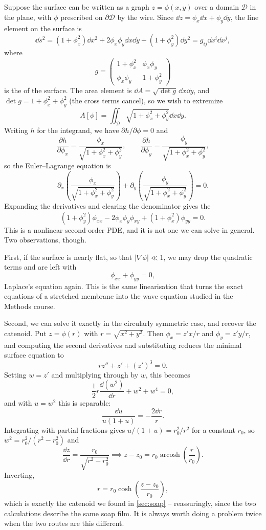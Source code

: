 Suppose the surface can be written as a graph $z = \phi(x, y)$ over a domain $\mathcal{D}$ in the plane, with $\phi$ prescribed on $\partial \mathcal D$ by the wire. Since $\dd z = \phi_x \dd x + \phi_y \dd y$, the line element on the surface is
$$
\dd s^2 = \left(1 + \phi_x^2\right)\dd x^2 + 2\phi_x\phi_y \dd x \dd y + \left(1 + \phi_y^2\right)\dd y^2 = g_{ij}\dd x^i \dd x^j,
$$
where
$$
g = \begin{pmatrix} 1 + \phi_x^2 & \phi_x\phi_y \\ \phi_x\phi_y & 1 + \phi_y^2\end{pmatrix}
$$
is the  of the surface. The area element is $\dd A = \sqrt{\det g}\,\dd x\dd y$, and $\det g = 1 + \phi_x^2 + \phi_y^2$ (the cross terms cancel), so we wish to extremize
$$
A[\phi] = \iint_{\mathcal D}\sqrt{1 + \phi_x^2 + \phi_y^2}\dd x \dd y.
$$
Writing $h$ for the integrand, we have $\partial h/\partial \phi = 0$ and
$$
\frac{\partial h}{\partial \phi_x} = \frac{\phi_x}{\sqrt{1 + \phi_x^2 + \phi_y^2}}, \qquad \frac{\partial h}{\partial \phi_y} = \frac{\phi_y}{\sqrt{1 + \phi_x^2 + \phi_y^2}},
$$
so the Euler--Lagrange equation is
$$
\partial_x\left(\frac{\phi_x}{\sqrt{1 + \phi_x^2 + \phi_y^2}}\right) + \partial_y\left(\frac{\phi_y}{\sqrt{1 + \phi_x^2 + \phi_y^2}}\right) = 0.
$$
Expanding the derivatives and clearing the denominator gives the 
$$
\left(1 + \phi_y^2\right)\phi_{xx} - 2\phi_x\phi_y\phi_{xy} + \left(1 + \phi_x^2\right)\phi_{yy} = 0.
$$
This is a nonlinear second-order PDE, and it is not one we can solve in general. Two observations, though.

First, if the surface is nearly flat, so that $|\nabla\phi| \ll 1$, we may drop the quadratic terms and are left with
$$
\phi_{xx} + \phi_{yy} = 0,
$$
Laplace's equation again. This is the same linearisation that turns the exact equations of a stretched membrane into the wave equation studied in the Methods course.

Second, we can solve it exactly in the circularly symmetric case, and recover the catenoid. Put $z = \phi(r)$ with $r = \sqrt{x^2 + y^2}$. Then $\phi_x = z' x/r$ and $\phi_y = z' y/r$, and computing the second derivatives and substituting reduces the minimal surface equation to
$$
r z'' + z' + (z')^3 = 0.
$$
Setting $w = z'$ and multiplying through by $w$, this becomes
$$
\frac{1}{2}r\frac{\dd (w^2)}{\dd r} + w^2 + w^4 = 0,
$$
and with $u = w^2$ this is separable:
$$
\frac{\dd u}{u(1 + u)} = -\frac{2\dd r}{r}.
$$
Integrating with partial fractions gives $u/(1+u) = r_0^2/r^2$ for a constant $r_0$, so $w^2 = r_0^2/(r^2 - r_0^2)$ and
$$
\frac{\dd z}{\dd r} = \frac{r_0}{\sqrt{r^2 - r_0^2}} \implies z - z_0 = r_0 \operatorname{arcosh}\left(\frac{r}{r_0}\right).
$$
Inverting,
$$
r = r_0\cosh\left(\frac{z - z_0}{r_0}\right),
$$
which is exactly the catenoid we found in \autoref{sec:soap} -- reassuringly, since the two calculations describe the same soap film. It is always worth doing a problem twice when the two routes are this different.

